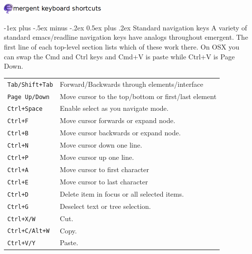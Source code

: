 \documentclass[10pt,landscape]{article}
\makeatletter
\renewcommand{\section}{\@startsection{section}{1}{0mm}%
                                {-1ex plus -.5ex minus -.2ex}%
                                {0.5ex plus .2ex}%
                                {\normalfont\large\bfseries}}
\makeatother
\begin{document}
\raggedright
\footnotesize
\begin{multicols}{3}
\vspace{-5mm}
\begin{center}\includegraphics[width=198.5px]{header.png}\end{center}
\setlength{\premulticols}{1pt}
\setlength{\postmulticols}{1pt}
\setlength{\multicolsep}{1pt}
\setlength{\columnsep}{2pt}
\section{Standard navigation keys}
A variety of standard emacs/readline navigation keys have analogs
throughout emergent. The first line of each top-level section lists
which of these work there. On OSX you can swap the Cmd and Ctrl keys
and Cmd+V is paste while Ctrl+V is Page Down. \\
\begin{tabular}{@{}ll@{}}
\verb!Tab/Shift+Tab! & Forward/Backwards through elements/interface \\
\verb!Page Up/Down!    & Move cursor to the top/bottom or first/last element\\
\verb!Ctrl+Space!    & Enable select as you navigate mode. \\
\verb!Ctrl+F!    & Move cursor forwards or expand node. \\
\verb!Ctrl+B!    & Move cursor backwards or expand node. \\
\verb!Ctrl+N!    & Move cursor down one line. \\
\verb!Ctrl+P!    & Move cursor up one line. \\
\verb!Ctrl+A!    & Move cursor to first character \\
\verb!Ctrl+E!    & Move cursor to last character \\
\verb!Ctrl+D!  & Delete item in focus or all selected items. \\
\verb!Ctrl+G!  & Deselect text or tree selection. \\
\verb!Ctrl+X/W! & Cut. \\
\verb!Ctrl+C/Alt+W! & Copy. \\
\verb!Ctrl+V/Y! & Paste.
\end{tabular}


\end{multicols}
\end{document}
